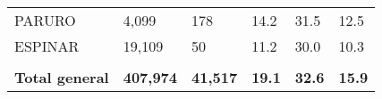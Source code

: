 \begin{tabular}{llllll}
	\cellcolor[HTML]{F8CBAD}PARURO                                 & 4,099                                                                 & 178                                                              & 14.2                                                                             & 31.5                                                                        & 12.5                                                                                \\
	\cellcolor[HTML]{F8CBAD}ESPINAR                                & 19,109                                                                & 50                                                               & 11.2                                                                             & 30.0                                                                        & 10.3                                                                                \\
	&                                                                       &                                                                  &                                                                                  &                                                                             &                                                                                     \\
	\rowcolor[HTML]{DDEBF7} 
	\textbf{Total   general}                                       & \textbf{407,974}                                                      & \textbf{41,517}                                                  & \textbf{19.1}                                                                    & \textbf{32.6}                                                               & \textbf{15.9}                                                                      
\end{tabular}
